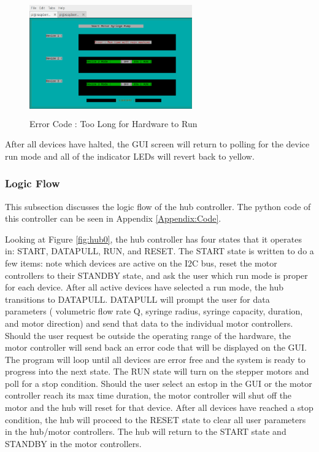 \documentclass[journal]{IEEEtran}
\begin{document}
            \begin{figure}[H]
                \centering
                \includegraphics[width=7cm, height=5cm]{GUI_15}
                \caption{Error Code : Too Long for Hardware to Run}
                \label{fig:GUI15}
            \end{figure}
            
            After all devices have halted, the GUI screen will return to polling for the device run mode and all of the indicator LEDs will revert back to yellow. 
        
        \subsubsection{Logic Flow}
            This subsection discusses the logic flow of the hub controller. The python code of this controller can be seen in Appendix \ref{Appendix:Code}. 
            
            Looking at Figure \ref{fig:hub0}, the hub controller has four states that it operates in: START, DATAPULL, RUN, and RESET. The START state is written to do a few items: note which devices are active on the I2C bus, reset the motor controllers to their STANDBY state, and ask the user which run mode is proper for each device. After all active devices have selected a run mode, the hub transitions to DATAPULL. DATAPULL will prompt the user for data parameters ( volumetric flow rate Q, syringe radius, syringe capacity, duration, and motor direction) and send that data to the individual motor controllers. Should the user request be outside the operating range of the hardware, the motor controller will send back an error code that will be displayed on the GUI. The program will loop until all devices are error free and the system is ready to progress into the next state. The RUN state will turn on the stepper motors and poll for a stop condition. Should the user select an estop in the GUI or the motor controller reach its max time duration, the motor controller will shut off the motor and the hub will reset for that device. After all devices have reached a stop condition, the hub will proceed to the RESET state to clear all user parameters in the hub/motor controllers. The hub will return to the START state and STANDBY in the motor controllers. 
            
\end{document}
